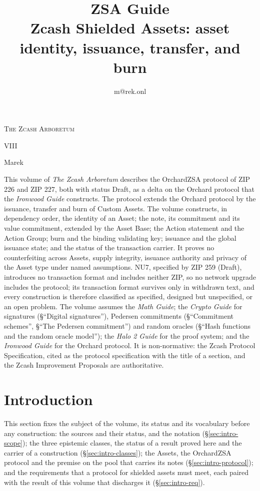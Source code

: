 \documentclass[11pt,a4paper]{article}
\title{\textbf{\Huge ZSA Guide}\\[6pt]\large Zcash Shielded Assets: asset identity, issuance, transfer, and burn}
\author{m@rek.onl}
\date{}
\makeatletter
\theoremstyle{definition}
\let\arb@tableofcontents\tableofcontents
\renewcommand{\tableofcontents}{{\hypersetup{pdfborderstyle={/S/U/W 0}}%
  \arb@tableofcontents}}
\providecommand{\accession}{}
\def\arb@name#1#2\@nil{\def\arbvolname{#2}}
\def\arb@parsetitle\textbf#1\\[#2]#3#4\@nil{\arb@name#1\@nil\def\arb@sub{#4}}
\providecommand{\arbvolname}{}
\renewcommand{\maketitle}{\expandafter\arb@parsetitle\@title\@nil
  \hypersetup{pdftitle={\arbvolname: \arb@sub},pdfauthor={Marek}}%
  \thispagestyle{empty}\begingroup\raggedright
  {\fontsize{13.2}{16}\selectfont\scshape The Zcash Arboretum\par}
  \vspace*{50mm}
  {\fontsize{47.3}{50}\selectfont\accession\par}
  \vspace{6mm}
  {\fontsize{22.8}{27}\selectfont\arbvolname\par}
  \vspace{3mm}
  {\fontsize{13.2}{17}\selectfont\arb@sub\par}
  \vspace{18mm}
  {\fontsize{13.2}{17}\selectfont Marek\par}
  {\small\@author\par}
  \endgroup\clearpage}
\renewenvironment{abstract}{%
  \small\begin{center}{\bfseries\abstractname}\end{center}\medskip\noindent\ignorespaces
}{\par\medskip}
\renewcommand{\accession}{VIII}
\makeatother
\begin{document}
\maketitle

\begin{abstract}
This volume of \emph{The Zcash Arboretum} describes the OrchardZSA protocol
of ZIP 226 and ZIP 227, both with status Draft, as a delta on the Orchard
protocol that the \emph{Ironwood Guide} constructs. The protocol extends the
Orchard protocol by the issuance, transfer and burn of Custom Assets. The
volume constructs, in dependency order, the identity of an Asset; the note,
its commitment and its value commitment, extended by the Asset Base; the
Action statement and the Action Group; burn and the binding validating key;
issuance and the global issuance state; and the status of the transaction
carrier. It proves no counterfeiting across Assets, supply integrity,
issuance authority and privacy of the Asset type under named assumptions.
NU7, specified by ZIP 259 (Draft), introduces no transaction format and
includes neither ZIP, so no network upgrade includes the protocol; its
transaction format survives only in withdrawn text, and every construction
is therefore classified as specified, designed but unspecified, or an open
problem. The volume assumes the \emph{Math Guide}; the \emph{Crypto Guide}
for signatures (\S``Digital signatures''), Pedersen commitments
(\S``Commitment schemes'', \S``The Pedersen commitment'') and random oracles
(\S``Hash functions and the random oracle model''); the \emph{Halo 2 Guide}
for the proof system; and the \emph{Ironwood Guide} for the Orchard
protocol. It is non-normative: the Zcash Protocol Specification, cited as
the protocol specification with the title of a section, and the Zcash
Improvement Proposals are authoritative.
\end{abstract}
\clearpage
\tableofcontents
\clearpage

\section{Introduction}\label{sec:intro}

This section fixes the subject of the volume, its status and its vocabulary
before any construction: the sources and their status, and the notation
(\S\ref{sec:intro-scope}); the three epistemic classes, the status of a
result proved here and the carrier of a construction
(\S\ref{sec:intro-classes}); the Assets, the OrchardZSA protocol and the
premise on the pool that carries its notes (\S\ref{sec:intro-protocol});
and the requirements that a protocol for shielded assets must meet, each
paired with the result of this volume that discharges it
(\S\ref{sec:intro-req}).
\end{document}
